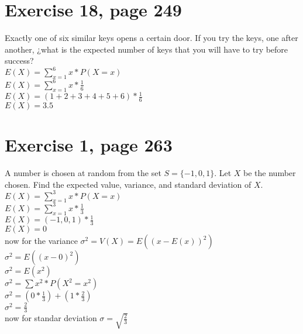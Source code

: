 \documentclass[]{article}
\begin{document}
\section{Exercise 18, page 249}
Exactly one of six similar keys opens a certain door. If you try the keys, one after another, ¿what is the expected number of keys that you will have to try before success?\\
$E(X) = \sum_{x = 1}^{6} x * P(X = x)$\\
$E(X) = \sum_{x = 1}^{6} x * \frac{1}{6}$\\
$E(X) = (1+2+3+4+5+6)* \frac{1}{6}$\\
$E(X) = 3.5$\\

\section{Exercise 1, page 263}
A number is chosen at random from the set $S = \{-1, 0, 1\}	$. Let $X$ be the number chosen. Find the expected value, variance, and standard deviation of $X$.\\
$E(X) = \sum_{x = 1}^{3} x * P(X = x)$\\
$E(X) = \sum_{x = 1}^{3} x * \frac{1}{3}$\\
$E(X) = (-1, 0, 1)* \frac{1}{3}$\\
$E(X) = 0$\\
now for the variance
$\sigma^{2} = V(X) = E((x-E(x))^{2})$\\
$\sigma^{2} = E((x-0)^{2})$\\
$\sigma^{2} = E(x^{2})$\\
$\sigma^{2} = \sum x^{2} * P(X^{2} = x^{2})$\\
$\sigma^{2}  = (0 * \frac{1}{3}) + (1 * \frac{2}{3})$\\
$\sigma^{2}  = \frac{2}{3}$\\
now for standar deviation
$\sigma = \sqrt{\frac{2}{3}}$\\
\end{document}
